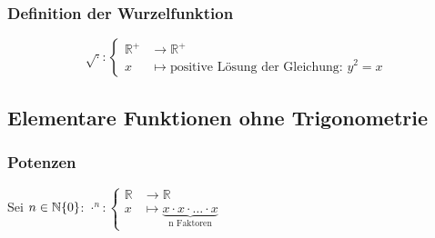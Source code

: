 \begin{multicols}{2}
\subsubsection{Definition der Wurzelfunktion}
	\[
		 \sqrt{\cdot} : \begin{cases}
			 \mathbb{R}^+ &\to \mathbb{R}^+ \\
			 x & \mapsto \text{positive Lösung der Gleichung: $y^2=x$}
		 \end{cases}
	\]


\subsection{Elementare Funktionen ohne Trigonometrie}

\subsubsection{Potenzen}
Sei $n \in \mathbb{N}\\\{0\}$:\space\space
$
	\cdot^n : \begin{cases}
		\mathbb{R} &\to \mathbb{R} \\
		x &\mapsto \underbrace{x \cdot x \cdot \ldots \cdot x}_\text{n Faktoren}
	\end{cases}
$

\end{multicols}


